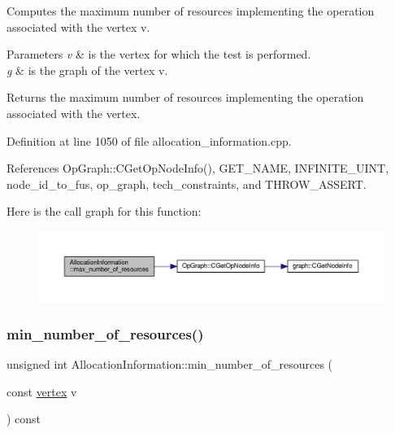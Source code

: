 Computes the maximum number of resources implementing the operation associated with the vertex v. 


\begin{DoxyParams}{Parameters}
{\em v} & is the vertex for which the test is performed. \\
\hline
{\em g} & is the graph of the vertex v. \\
\hline
\end{DoxyParams}
\begin{DoxyReturn}{Returns}
the maximum number of resources implementing the operation associated with the vertex. 
\end{DoxyReturn}


Definition at line 1050 of file allocation\+\_\+information.\+cpp.



References Op\+Graph\+::\+C\+Get\+Op\+Node\+Info(), G\+E\+T\+\_\+\+N\+A\+ME, I\+N\+F\+I\+N\+I\+T\+E\+\_\+\+U\+I\+NT, node\+\_\+id\+\_\+to\+\_\+fus, op\+\_\+graph, tech\+\_\+constraints, and T\+H\+R\+O\+W\+\_\+\+A\+S\+S\+E\+RT.

Here is the call graph for this function\+:
\nopagebreak
\begin{figure}[H]
\begin{center}
\leavevmode
\includegraphics[width=350pt]{d7/d79/classAllocationInformation_a2e8890d648962f9ae7138611f05edb28_cgraph}
\end{center}
\end{figure}
\mbox{\label{classAllocationInformation_a156ffef1d503c9b31d53d40a6a1501a8}} 
\subsubsection{\texorpdfstring{min\+\_\+number\+\_\+of\+\_\+resources()}{min\_number\_of\_resources()}}
{\footnotesize\ttfamily unsigned int Allocation\+Information\+::min\+\_\+number\+\_\+of\+\_\+resources (\begin{DoxyParamCaption}\item[{const \hyperlink{graph_8hpp_abefdcf0544e601805af44eca032cca14}{vertex}}]{v }\end{DoxyParamCaption}) const}



